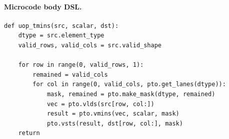 \paragraph{Microcode body DSL.}
\begin{lstlisting}[style=ptocode]
def uop_tmins(src, scalar, dst):
    dtype = src.element_type
    valid_rows, valid_cols = src.valid_shape

    for row in range(0, valid_rows, 1):
        remained = valid_cols
        for col in range(0, valid_cols, pto.get_lanes(dtype)):
            mask, remained = pto.make_mask(dtype, remained)
            vec = pto.vlds(src[row, col:])
            result = pto.vmins(vec, scalar, mask)
            pto.vsts(result, dst[row, col:], mask)
    return
\end{lstlisting}
\Needspace{0.34\textheight}

